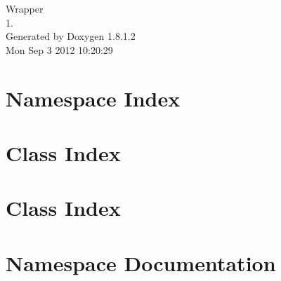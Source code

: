 \documentclass{book}
\begin{document}
\hypersetup{pageanchor=false,citecolor=blue}
\begin{titlepage}
\vspace*{7cm}
\begin{center}
{\Large Wrapper \\[1ex]\large 1. }\\
\vspace*{1cm}
{\large Generated by Doxygen 1.8.1.2}\\
\vspace*{0.5cm}
{\small Mon Sep 3 2012 10:20:29}\\
\end{center}
\end{titlepage}
\clearemptydoublepage
{}
\tableofcontents
\clearemptydoublepage
{}
\hypersetup{pageanchor=true,citecolor=blue}
\chapter{Namespace Index}

\chapter{Class Index}

\chapter{Class Index}

\chapter{Namespace Documentation}

\end{document}
